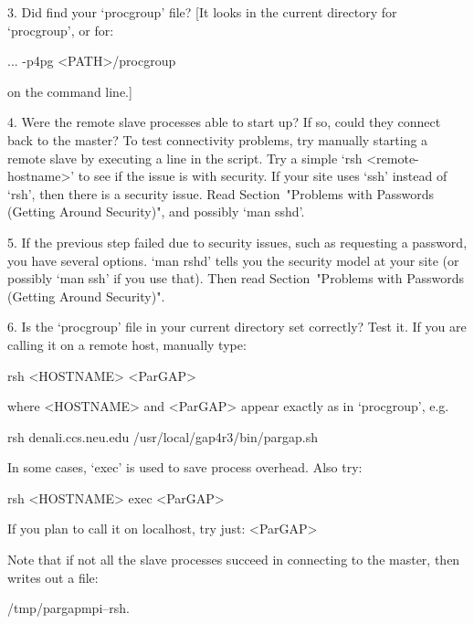 \item{3.}
    Did {\ParGAP} find your `procgroup' file?
    [It looks in the current directory for `procgroup', or for:

... -p4pg <PATH>/procgroup

\item{}
    on the command line.]

\item{4.}
    Were the remote slave processes able to start up? If so,  could  they
    connect back to  the  master?  To  test  connectivity  problems,  try
    manually starting a remote slave by executing a line in  the  script.
    Try a simple `rsh <remote-hostname>' to see  if  the  issue  is  with
    security. If your site uses `ssh' instead of `rsh', then there  is  a
    security issue. Read Section~"Problems with Passwords (Getting Around
    Security)", and possibly `man sshd'.

\item{5.}
    If  the  previous  step  failed  due  to  security  issues,  such  as
    requesting a password, you have several options. `man rshd' tells you
    the security model at your site (or possibly `man  ssh'  if  you  use
    that). Then read Section~"Problems  with  Passwords  (Getting  Around
    Security)".

\item{6.}
    Is the `procgroup' file in your current directory set correctly?
    Test it.  If you are calling it on a remote host, manually type:

rsh <HOSTNAME> <ParGAP>

\item{}
    where <HOSTNAME> and <ParGAP> appear exactly as in `procgroup', e.g.
    
rsh denali.ccs.neu.edu /usr/local/gap4r3/bin/pargap.sh

\item{}
    In some cases, `exec' is used to save process overhead. Also try:

rsh <HOSTNAME> exec <ParGAP>

\item{}
    If you plan to call it on localhost, try just:   <ParGAP>

\item{}
    Note that if not all the slave processes succeed in connecting
    to the master, then {\ParGAP} writes out a file:

\begintt
/tmp/pargapmpi--rsh.$$
\endtt
       
